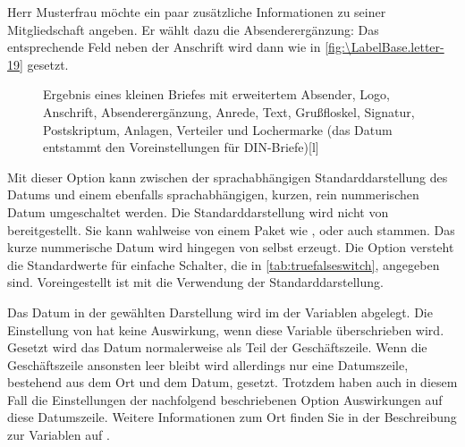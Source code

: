 \begin{Example}
  Herr Musterfrau möchte ein paar zusätzliche Informationen zu seiner
  Mitgliedschaft angeben. Er wählt dazu die Absenderergänzung:%
  Das entsprechende Feld neben der Anschrift wird dann wie in
  \autoref{fig:\LabelBase.letter-19} gesetzt.
  \begin{figure}
    \setcapindent{0pt}%
    \begin{captionbeside}{Ergebnis
        eines kleinen Briefes mit erweitertem Absender, Logo, 
        Anschrift, Absenderergänzung, Anrede, Text, Grußfloskel, Signatur,
        Postskriptum, Anlagen, Verteiler und Lochermarke (das Datum entstammt
        den Voreinstellungen für DIN-Briefe)}[l]
    \end{captionbeside}
    \label{fig:\LabelBase.letter-19}
  \end{figure}
\end{Example}
%
\EndIndexGroup
\EndIndexGroup


\begin{Declaration}
\end{Declaration}
Mit dieser Option kann zwischen der sprachabhängigen Standarddarstellung des
Datums und einem ebenfalls
sprachabhängigen, kurzen, rein nummerischen Datum umgeschaltet werden. Die
Standarddarstellung wird nicht von \KOMAScript{} bereitgestellt. Sie kann
wahlweise von einem Paket wie ,
 oder auch
stammen. Das kurze nummerische
Datum wird hingegen von  selbst erzeugt. Die Option versteht
die Standardwerte für einfache Schalter, die in \autoref{tab:truefalseswitch},
 angegeben
sind. Voreingestellt ist mit  die
Verwendung der Standarddarstellung.

\begin{Declaration}
\end{Declaration}
Das Datum in der gewählten Darstellung wird im  der Variablen
 abgelegt. Die Einstellung von
%
 hat keine Auswirkung,
wenn diese Variable überschrieben wird. Gesetzt wird das Datum normalerweise
als Teil der Geschäftszeile. Wenn die Geschäftszeile ansonsten leer bleibt
wird allerdings nur eine Datumszeile, bestehend aus dem Ort und dem Datum,
gesetzt. Trotzdem haben auch in diesem Fall die Einstellungen der nachfolgend
beschriebenen Option  Auswirkungen auf
diese Datumszeile. Weitere Informationen zum Ort finden Sie in der
Beschreibung zur Variablen
 auf
.%
%
\EndIndexGroup
\EndIndexGroup



